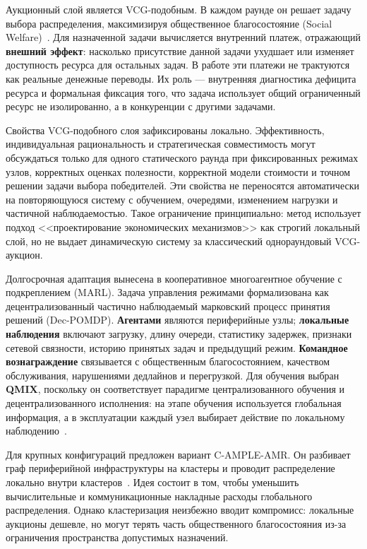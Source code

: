 \documentclass[a4paper,14pt]{extarticle}
\newcommand{\clustermethodname}{C-AMPLE-AMR}
\begin{document}
Аукционный слой является VCG-подобным. В каждом раунде он решает задачу выбора распределения, максимизируя общественное благосостояние (Social Welfare)~\cite{Arrow2011SocialWelfareHandbook}. Для назначенной задачи вычисляется внутренний платеж, отражающий \textbf{внешний эффект}: насколько присутствие данной задачи ухудшает или изменяет доступность ресурса для остальных задач. В работе эти платежи не трактуются как реальные денежные переводы. Их роль --- внутренняя диагностика дефицита ресурса и формальная фиксация того, что задача использует общий ограниченный ресурс не изолированно, а в конкуренции с другими задачами.

Свойства VCG-подобного слоя зафиксированы локально. Эффективность, индивидуальная рациональность и стратегическая совместимость могут обсуждаться только для одного статического раунда при фиксированных режимах узлов, корректных оценках полезности, корректной модели стоимости и точном решении задачи выбора победителей. Эти свойства не переносятся автоматически на повторяющуюся систему с обучением, очередями, изменением нагрузки и частичной наблюдаемостью. Такое ограничение принципиально: метод использует подход <<проектирование экономических механизмов>> как строгий локальный слой, но не выдает динамическую систему за классический однораундовый VCG-аукцион.

Долгосрочная адаптация вынесена в кооперативное многоагентное обучение с подкреплением (MARL). Задача управления режимами формализована как децентрализованный частично наблюдаемый марковский процесс принятия решений (Dec-POMDP). \textbf{Агентами} являются периферийные узлы; \textbf{локальные наблюдения} включают загрузку, длину очереди, статистику задержек, признаки сетевой связности, историю принятых задач и предыдущий режим. \textbf{Командное вознаграждение} связывается с общественным благосостоянием, качеством обслуживания, нарушениями дедлайнов и перегрузкой. Для обучения выбран \textbf{QMIX}, поскольку он соответствует парадигме централизованного обучения и децентрализованного исполнения: на этапе обучения используется глобальная информация, а в эксплуатации каждый узел выбирает действие по локальному наблюдению~\cite{Oliehoek2016DecPOMDP,Amato2024CTDE,Sunehag2017VDN,Rashid2018QMIX}.

Для крупных конфигураций предложен вариант \clustermethodname{}. Он разбивает граф периферийной инфраструктуры на кластеры и проводит распределение локально внутри кластеров~\cite{Karypis1998Metis,Blondel2008Louvain}. Идея состоит в том, чтобы уменьшить вычислительные и коммуникационные накладные расходы глобального распределения. Однако кластеризация неизбежно вводит компромисс: локальные аукционы дешевле, но могут терять часть общественного благосостояния из-за ограничения пространства допустимых назначений.
\end{document}
